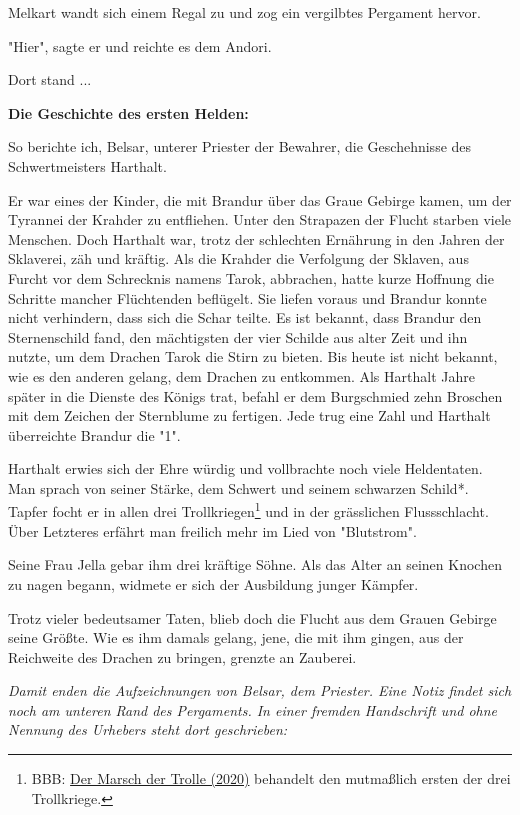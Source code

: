 \documentclass[10pt, a4paper, oneside]{book}
\newcommand{\reflegende}[1]{\hyperref[Legende: #1]{#1}}
\begin{document}
\begin{multicols}{2}
Melkart wandt sich einem Regal zu und zog ein vergilbtes Pergament hervor.\bigskip

"Hier", sagte er und reichte es dem Andori.\bigskip

Dort stand ...\bigskip

\textbf{Die Geschichte des ersten Helden:}\bigskip

So berichte ich, Belsar, unterer Priester der Bewahrer, die Geschehnisse des Schwertmeisters Harthalt.\bigskip

Er war eines der Kinder, die mit Brandur über das Graue Gebirge kamen, um der Tyrannei der Krahder zu entfliehen. Unter den Strapazen der Flucht starben viele Menschen. Doch Harthalt war, trotz der schlechten Ernährung in den Jahren der Sklaverei, zäh und kräftig. Als die Krahder die Verfolgung der Sklaven, aus Furcht vor dem Schrecknis namens Tarok, abbrachen, hatte kurze Hoffnung die Schritte mancher Flüchtenden beflügelt. Sie liefen voraus und Brandur konnte nicht verhindern, dass sich die Schar teilte. Es ist bekannt, dass Brandur den Sternenschild fand, den mächtigsten der vier Schilde aus alter Zeit und ihn nutzte, um dem Drachen Tarok die Stirn zu bieten. Bis heute ist nicht bekannt, wie es den anderen gelang, dem Drachen zu entkommen. Als Harthalt Jahre später in die Dienste des Königs trat, befahl er dem Burgschmied zehn Broschen mit dem Zeichen der Sternblume zu fertigen. Jede trug eine Zahl und Harthalt überreichte Brandur die "1".\bigskip

Harthalt erwies sich der Ehre würdig und vollbrachte noch viele Heldentaten. Man sprach von seiner Stärke, dem Schwert und seinem schwarzen Schild*. Tapfer focht er in allen drei Trollkriegen\footnote{BBB: \reflegende{Der Marsch der Trolle (2020)} behandelt den mutmaßlich ersten der drei Trollkriege.} und in der grässlichen Flussschlacht. Über Letzteres erfährt man freilich mehr im Lied von "Blutstrom".\bigskip

Seine Frau Jella gebar ihm drei kräftige Söhne. Als das Alter an seinen Knochen zu nagen begann, widmete er sich der Ausbildung junger Kämpfer.\bigskip

Trotz vieler bedeutsamer Taten, blieb doch die Flucht aus dem Grauen Gebirge seine Größte. Wie es ihm damals gelang, jene, die mit ihm gingen, aus der Reichweite des Drachen zu bringen, grenzte an Zauberei.

\textit{Damit enden die Aufzeichnungen von Belsar, dem Priester. Eine Notiz findet sich noch am unteren Rand des Pergaments. In einer fremden Handschrift und ohne Nennung des Urhebers steht dort geschrieben:}\bigskip


\end{multicols}
\end{document}
